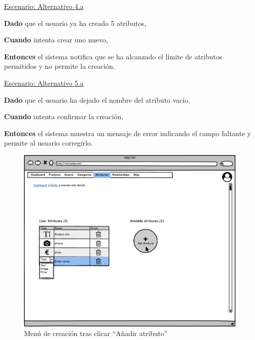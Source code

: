 \underline{Escenario: Alternativo 4.a}\par
\vspace{0.15cm}
\textbf{Dado} que el usuario ya ha creado 5 atributos,\par
\textbf{Cuando} intenta crear uno nuevo,\par
\textbf{Entonces} el sistema notifica que se ha alcanzado el límite de atributos permitidos y no permite la creación.\par
\vspace{0.20cm}

\underline{Escenario: Alternativo 5.a}\par
\vspace{0.15cm}
\textbf{Dado} que el usuario ha dejado el nombre del atributo vacío,\par
\textbf{Cuando} intenta confirmar la creación,\par
\textbf{Entonces} el sistema muestra un mensaje de error indicando el campo faltante y permite al usuario corregirlo.\par
\vspace{0.20cm}


\begin{figure}[H]
    \includegraphics[width=1\linewidth]{mockups/RF6.1Crear_Atributo tras Clickar.png}
    \caption{Menú de creación tras clicar \enquote{Añadir atributo}}
   \end{figure}
\vspace{1.0cm}

\newpage %